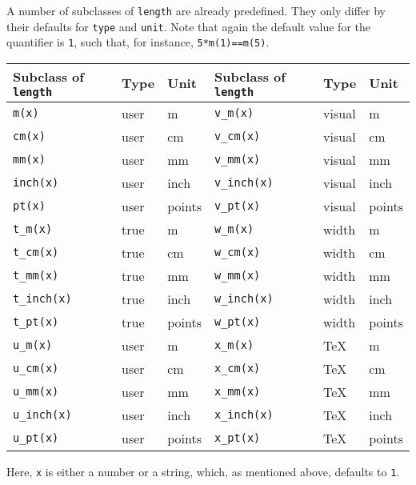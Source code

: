 A number of subclasses of \verb|length| are already predefined.  They
only differ by their defaults for \verb|type| and \verb|unit|. Note
that again the default value for the quantifier is \verb|1|, such
that, for instance, \texttt{5*m(1)==m(5)}.

\medskip
\begin{center}
\begin{tabular}{lll|lll}
Subclass of \texttt{length} & Type & Unit & Subclass of \texttt{length} & Type & Unit\\
\hline
\texttt{m(x)} & user & m & \texttt{v\_m(x)} & visual & m\\
\texttt{cm(x)} & user & cm & \texttt{v\_cm(x)} & visual & cm\\
\texttt{mm(x)} & user & mm & \texttt{v\_mm(x)} & visual & mm\\
\texttt{inch(x)} & user & inch & \texttt{v\_inch(x)} & visual & inch\\
\texttt{pt(x)} & user & points & \texttt{v\_pt(x)} & visual & points\\
\texttt{t\_m(x)} & true & m & \texttt{w\_m(x)} & width & m\\
\texttt{t\_cm(x)} & true & cm & \texttt{w\_cm(x)} & width & cm\\
\texttt{t\_mm(x)} & true & mm & \texttt{w\_mm(x)} & width & mm\\
\texttt{t\_inch(x)} & true & inch & \texttt{w\_inch(x)} & width & inch\\
\texttt{t\_pt(x)} & true & points & \texttt{w\_pt(x)} & width & points\\
\texttt{u\_m(x)} & user & m & \texttt{x\_m(x)} & \TeX & m \\
\texttt{u\_cm(x)} & user & cm & \texttt{x\_cm(x)} & \TeX & cm \\
\texttt{u\_mm(x)} & user & mm & \texttt{x\_mm(x)} & \TeX & mm \\
\texttt{u\_inch(x)} & user & inch & \texttt{x\_inch(x)} & \TeX & inch \\
\texttt{u\_pt(x)} & user & points & \texttt{x\_pt(x)} & \TeX & points\\

\end{tabular}
\end{center}
\medskip
Here, \verb|x| is either a number or a string, which, as mentioned
above, defaults to \texttt{1}.

